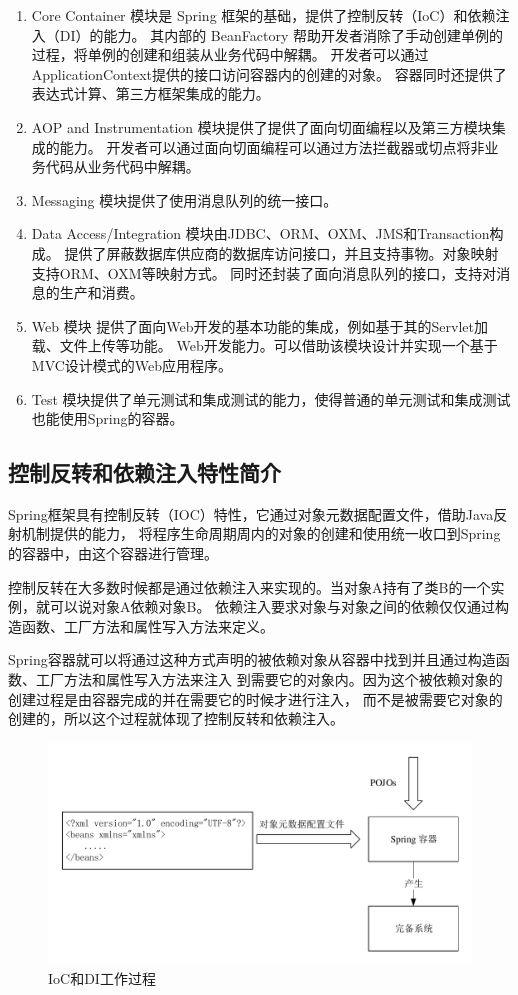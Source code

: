 \begin{enumerate}
    \item Core Container 模块是 Spring 框架的基础，提供了控制反转（IoC）和依赖注入（DI）的能力。
    其内部的 BeanFactory 帮助开发者消除了手动创建单例的过程，将单例的创建和组装从业务代码中解耦。
    开发者可以通过ApplicationContext提供的接口访问容器内的创建的对象。
    容器同时还提供了表达式计算、第三方框架集成的能力。
    \item AOP and Instrumentation 模块提供了提供了面向切面编程以及第三方模块集成的能力。
    开发者可以通过面向切面编程可以通过方法拦截器或切点将非业务代码从业务代码中解耦。
    \item Messaging 模块提供了使用消息队列的统一接口。
    \item Data Access/Integration 模块由JDBC、ORM、OXM、JMS和Transaction构成。
    提供了屏蔽数据库供应商的数据库访问接口，并且支持事物。对象映射支持ORM、OXM等映射方式。
    同时还封装了面向消息队列的接口，支持对消息的生产和消费。
    \item Web 模块 提供了面向Web开发的基本功能的集成，例如基于其的Servlet加载、文件上传等功能。
    Web开发能力。可以借助该模块设计并实现一个基于MVC设计模式的Web应用程序。
    \item Test 模块提供了单元测试和集成测试的能力，使得普通的单元测试和集成测试也能使用Spring的容器。
\end{enumerate}

\subsection{控制反转和依赖注入特性简介}
Spring框架具有控制反转（IOC）特性，它通过对象元数据配置文件，借助Java反射机制提供的能力，
将程序生命周期周内的对象的创建和使用统一收口到Spring的容器中，由这个容器进行管理。

控制反转在大多数时候都是通过依赖注入来实现的。当对象A持有了类B的一个实例，就可以说对象A依赖对象B。
依赖注入要求对象与对象之间的依赖仅仅通过构造函数、工厂方法和属性写入方法来定义。

Spring容器就可以将通过这种方式声明的被依赖对象从容器中找到并且通过构造函数、工厂方法和属性写入方法来注入
到需要它的对象内。因为这个被依赖对象的创建过程是由容器完成的并在需要它的时候才进行注入，
而不是被需要它对象的创建的，所以这个过程就体现了控制反转和依赖注入。

\begin{figure}[ht]
    \centering   
    \includegraphics[width=0.8\linewidth]{./Figure/IMG_container.pdf}
    \caption{IoC和DI工作过程}\label{Fig:container}
\end{figure}

